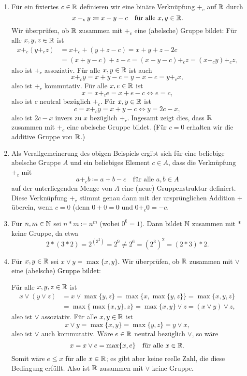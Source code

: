 \begin{enumerate}[leftmargin=*]
 \item
  Für ein fixiertes $c \in \mathbb{R}$ definieren wir eine binäre Verknüpfung $+_c$ auf $\mathbb{R}$ durch
  \[
   x +_c y
   \coloneqq x + y - c
   \quad
   \text{für alle $x,y \in \mathbb{R}$}.
  \]
  Wir überprüfen, ob $\mathbb{R}$ zusammen mit $+_c$ eine (abelsche) Gruppe bildet: Für alle $x, y, z \in \mathbb{R}$ ist
  \begin{align*}
   x +_c (y +_c z)
   &= x +_c + (y + z - c)
   = x + y + z - 2c \\
   &= (x + y - c) + z - c
   = (x + y - c) +_c z
   = (x +_c y) +_c z,
  \end{align*}
  also ist $+_c$ assoziativ. Für alle $x, y \in \mathbb{R}$ ist auch
  \[
   x +_c y
   = x + y - c
   = y + x - c
   = y +_c x,
  \]
  also ist $+_c$ kommutativ. Für alle $x, e \in \mathbb{R}$ ist
  \[
   x = x +_c e = x + e - c \Leftrightarrow e = c,
  \]
  also ist $c$ neutral bezüglich $+_c$. Für $x,y \in \mathbb{R}$ ist
  \[
   c = x +_c y = x + y - c \Leftrightarrow y = 2c - x,
  \]
  also ist $2c - x$ invers zu $x$ bezüglich $+_c$. Ingesamt zeigt dies, dass $\mathbb{R}$ zusammen mit $+_c$ eine abelsche Gruppe bildet. (Für $c = 0$ erhalten wir die additive Gruppe von $\mathbb{R}$.)
  
 \item
  Als Verallgemeinerung des obigen Beispiels ergibt sich für eine beliebige abelsche Gruppe $A$ und ein beliebiges Element $c \in A$, dass die Verknüpfung $+_c$ mit
  \[
   a +_c b \coloneqq a + b - c
   \quad
   \text{für alle $a,b \in A$}
  \]
  auf der unterliegenden Menge von $A$ eine (neue) Gruppenstruktur definiert. Diese Verknüpfung $+_c$ stimmt genau dann mit der ursprünglichen Addition $+$ überein, wenn $c = 0$ (denn $0 + 0 = 0$ und $0 +_c 0 = -c$.
  
 \item
  Für $n,m \in \mathbb{N}$ sei $n * m \coloneqq n^m$ (wobei $0^0 = 1$). Dann bildet $\mathbb{N}$ zusammen mit $*$ keine Gruppe, da etwa
  \[
   2 * (3 * 2)
   = 2^{(3^2)}
   = 2^9 \neq 2^6
   = (2^3)^2
   = (2 * 3) * 2.
  \]
  
 \item
  Für $x,y \in \mathbb{R}$ sei $x \vee y = \max\{x,y\}$. Wir überprüfen, ob $\mathbb{R}$ zusammen mit $\vee$ eine (abelsche) Gruppe bildet:
  
  Für alle $x,y,z \in \mathbb{R}$ ist
  \begin{align*}
   x \vee (y \vee z)
   &= x \vee \max\{y,z\}
   = \max\{x, \max\{y,z\}\}
   = \max\{x,y,z\} \\
   &= \max\{\max\{x,y\}, z\}
   = \max\{x,y\} \vee z
   = (x \vee y) \vee z,
  \end{align*}
  also ist $\vee$ assoziativ. Für alle $x,y \in \mathbb{R}$ ist
  \[
   x \vee y = \max\{x,y\} = \max\{y,z\} = y \vee x,
  \]
  also ist $\vee$ auch kommutativ. Wäre $e \in \mathbb{R}$ neutral bezüglich $\vee$, so wäre
  \[
   x = x \vee e = \max\{x,e\} \quad\text{für alle $x \in \mathbb{R}$}.
  \]
  Somit wäre $e \leq x$ für alle $x \in \mathbb{R}$; es gibt aber keine reelle Zahl, die diese Bedingung erfüllt. Also ist $\mathbb{R}$ zusammen mit $\vee$ keine Gruppe.
  

\end{enumerate}
